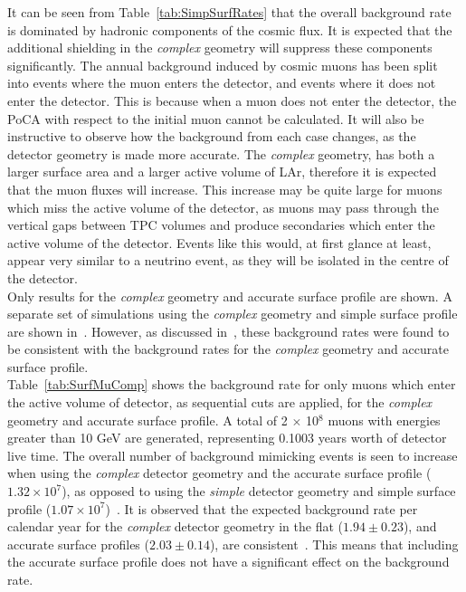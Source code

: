 It can be seen from Table~\ref{tab:SimpSurfRates} that the overall background rate is dominated by hadronic components of the cosmic flux. It is expected that the additional shielding in the \emph{complex} geometry will suppress these components significantly. The annual background induced by cosmic muons has been split into events where the muon enters the detector, and events where it does not enter the detector. This is because when a muon does not enter the detector, the PoCA with respect to the initial muon cannot be calculated. It will also be instructive to observe how the background from each case changes, as the detector geometry is made more accurate. The \emph{complex} geometry, has both a larger surface area and a larger active volume of LAr, therefore it is expected that the muon fluxes will increase. This increase may be quite large for muons which miss the active volume of the detector, as muons may pass through the vertical gaps between TPC volumes and produce secondaries which enter the active volume of the detector. Events like this would, at first glance at least, appear very similar to a neutrino event, as they will be isolated in the centre of the detector. \\

Only results for the \emph{complex} geometry and accurate surface profile are shown. A separate set of simulations using the \emph{complex} geometry and simple surface profile are shown in~\citep{MartinsThesis}. However, as discussed in~\citep{MartinsThesis}, these background rates were found to be consistent with the background rates for the \emph{complex} geometry and accurate surface profile. \\

Table~\ref{tab:SurfMuComp} shows the background rate for only muons which enter the active volume of detector, as sequential cuts are applied, for the \emph{complex} geometry and accurate surface profile. A total of 2 $\times$ 10$^8$ muons with energies greater than 10 GeV are generated, representing 0.1003 years worth of detector live time. The overall number of background mimicking events is seen to increase when using the \emph{complex} detector geometry and the accurate surface profile ($1.32\times10^7$), as opposed to using the \emph{simple} detector geometry and simple surface profile ($1.07\times10^7$)~\citep{MartinsThesis}. It is observed that the expected background rate per calendar year for the \emph{complex} detector geometry in the flat ($1.94\pm0.23$), and accurate surface profiles ($2.03\pm0.14$), are consistent~\citep{MartinsThesis}. This means that including the accurate surface profile does not have a significant effect on the background rate. \\

